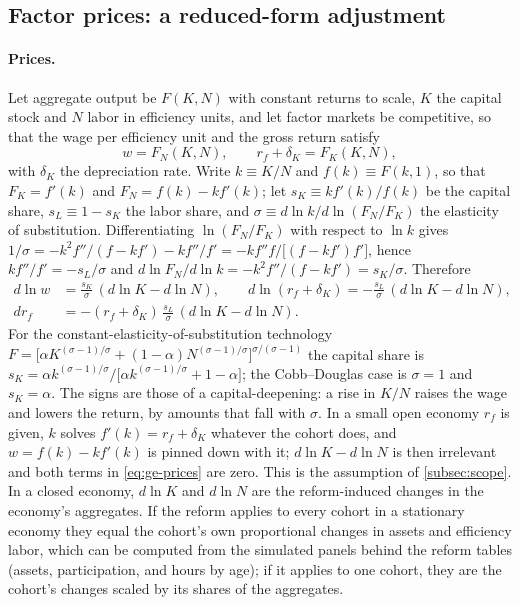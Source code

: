 \subsection{Factor prices: a reduced-form adjustment}\label{app:factorprices}

\paragraph{Prices.}
Let aggregate output be $F(K,N)$ with constant returns to scale, $K$ the capital stock and $N$ labor in efficiency units, and let factor markets be competitive, so that the wage per efficiency unit and the gross return satisfy
\begin{equation}\label{eq:app-fprices}
w=F_N(K,N),\qquad r_f+\delta_K=F_K(K,N),
\end{equation}
with $\delta_K$ the depreciation rate. Write $k\equiv K/N$ and $f(k)\equiv F(k,1)$, so that $F_K=f'(k)$ and $F_N=f(k)-kf'(k)$; let $s_K\equiv kf'(k)/f(k)$ be the capital share, $s_L\equiv1-s_K$ the labor share, and $\sigma\equiv d\ln k/d\ln(F_N/F_K)$ the elasticity of substitution. Differentiating $\ln(F_N/F_K)$ with respect to $\ln k$ gives $1/\sigma=-k^{2}f''/(f-kf')-kf''/f'=-kf''f/\bigl[(f-kf')f'\bigr]$, hence $kf''/f'=-s_L/\sigma$ and $d\ln F_N/d\ln k=-k^{2}f''/(f-kf')=s_K/\sigma$. Therefore
\begin{equation}\label{eq:ge-prices}
\begin{aligned}
d\ln w&=\frac{s_K}{\sigma}\,(d\ln K-d\ln N),
\qquad
d\ln(r_f+\delta_K)=-\frac{s_L}{\sigma}\,(d\ln K-d\ln N),\\
dr_f&=-(r_f+\delta_K)\,\frac{s_L}{\sigma}\,(d\ln K-d\ln N).
\end{aligned}
\end{equation}
For the constant-elasticity-of-substitution technology $F=\bigl[\alpha K^{(\sigma-1)/\sigma}+(1-\alpha)N^{(\sigma-1)/\sigma}\bigr]^{\sigma/(\sigma-1)}$ the capital share is $s_K=\alpha k^{(\sigma-1)/\sigma}/\bigl[\alpha k^{(\sigma-1)/\sigma}+1-\alpha\bigr]$; the Cobb--Douglas case is $\sigma=1$ and $s_K=\alpha$. The signs are those of a capital-deepening: a rise in $K/N$ raises the wage and lowers the return, by amounts that fall with $\sigma$. In a small open economy $r_f$ is given, $k$ solves $f'(k)=r_f+\delta_K$ whatever the cohort does, and $w=f(k)-kf'(k)$ is pinned down with it; $d\ln K-d\ln N$ is then irrelevant and both terms in \eqref{eq:ge-prices} are zero. This is the assumption of \autoref{subsec:scope}. In a closed economy, $d\ln K$ and $d\ln N$ are the reform-induced changes in the economy's aggregates. If the reform applies to every cohort in a stationary economy they equal the cohort's own proportional changes in assets and efficiency labor, which can be computed from the simulated panels behind the reform tables (assets, participation, and hours by age); if it applies to one cohort, they are the cohort's changes scaled by its shares of the aggregates.

